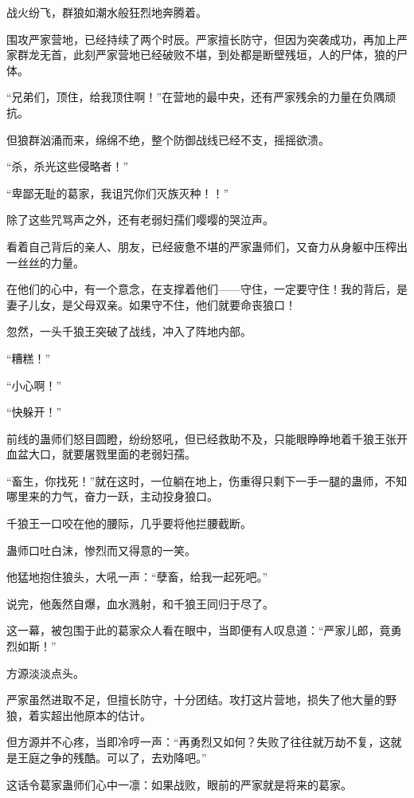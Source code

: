 
\begin{this_body}

战火纷飞，群狼如潮水般狂烈地奔腾着。

围攻严家营地，已经持续了两个时辰。严家擅长防守，但因为突袭成功，再加上严家群龙无首，此刻严家营地已经破败不堪，到处都是断壁残垣，人的尸体，狼的尸体。

“兄弟们，顶住，给我顶住啊！”在营地的最中央，还有严家残余的力量在负隅顽抗。

但狼群汹涌而来，绵绵不绝，整个防御战线已经不支，摇摇欲溃。

“杀，杀光这些侵略者！”

“卑鄙无耻的葛家，我诅咒你们灭族灭种！！”

除了这些咒骂声之外，还有老弱妇孺们嘤嘤的哭泣声。

看着自己背后的亲人、朋友，已经疲惫不堪的严家蛊师们，又奋力从身躯中压榨出一丝丝的力量。

在他们的心中，有一个意念，在支撑着他们——守住，一定要守住！我的背后，是妻子儿女，是父母双亲。如果守不住，他们就要命丧狼口！

忽然，一头千狼王突破了战线，冲入了阵地内部。

“糟糕！”

“小心啊！”

“快躲开！”

前线的蛊师们怒目圆瞪，纷纷怒吼，但已经救助不及，只能眼睁睁地着千狼王张开血盆大口，就要屠戮里面的老弱妇孺。

“畜生，你找死！”就在这时，一位躺在地上，伤重得只剩下一手一腿的蛊师，不知哪里来的力气，奋力一跃，主动投身狼口。

千狼王一口咬在他的腰际，几乎要将他拦腰截断。

蛊师口吐白沫，惨烈而又得意的一笑。

他猛地抱住狼头，大吼一声：“孽畜，给我一起死吧。”

说完，他轰然自爆，血水溅射，和千狼王同归于尽了。

这一幕，被包围于此的葛家众人看在眼中，当即便有人叹息道：“严家儿郎，竟勇烈如斯！”

方源淡淡点头。

严家虽然进取不足，但擅长防守，十分团结。攻打这片营地，损失了他大量的野狼，着实超出他原本的估计。

但方源并不心疼，当即冷哼一声：“再勇烈又如何？失败了往往就万劫不复，这就是王庭之争的残酷。可以了，去劝降吧。”

这话令葛家蛊师们心中一凛：如果战败，眼前的严家就是将来的葛家。


\end{this_body}
